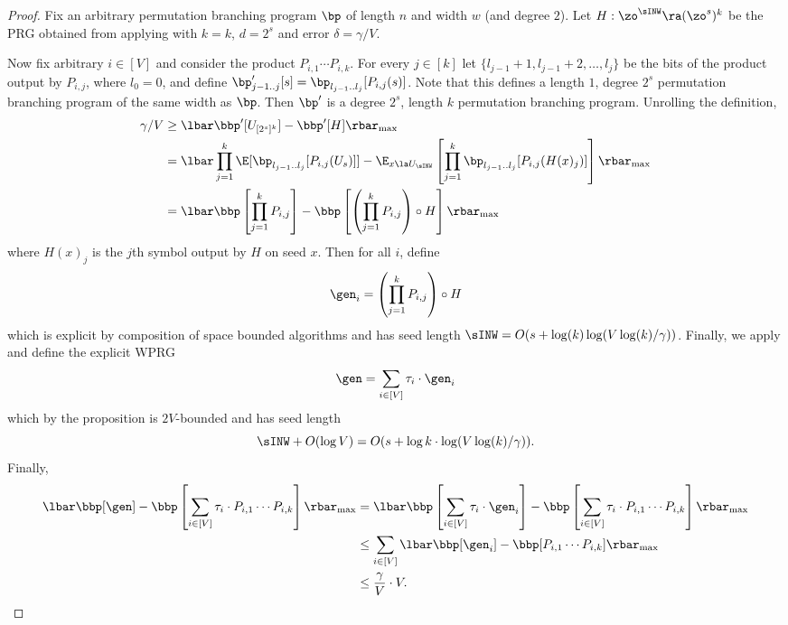 \begin{proof}
Fix an arbitrary permutation branching program $\bp$ of length $n$ and width $w$ (and degree $2$). Let $H:\zo^{\sINW}\ra (\zo^s)^k$ be the PRG obtained from applying  with $k=k$, $d=2^s$ and error $\delta=\gamma/V$.

Now fix arbitrary $i \in [V]$ and consider the product $P_{i,1}\cdots P_{i,k}$. For every $j\in[k]$ let $\{l_{j-1}+1,l_{j-1}+2,\ldots,l_j\}$ be the bits of the product output by $P_{i,j}$, where $l_{0}=0$, and define $\bp'_{j-1..j}[s]=\bp_{l_{j-1}..l_j}[P_{i,j}(s)]$. Note that this defines a length $1$, degree $2^s$ permutation branching program of the same width as $\bp$.
Then $\bp'$ is a degree $2^s$, length $k$ permutation branching program. Unrolling the definition,
\begin{align*}
    \gamma/V &\geq \lbar\bbp'[U_{[2^s]^k}]-\bbp'[H]\rbar_{\max}\\
    &= \lbar \prod_{j=1}^k\E[\bp_{l_{j-1}..l_j}[P_{i,j}(U_s)]] - \E_{x\la U_{\sINW}}\left[ \prod_{j=1}^k\bp_{l_{j-1}..l_j}[P_{i,j}(H(x)_j)]\right]\rbar_{\max}\\
    &= \lbar\bbp\left[\prod_{j=1}^k P_{i,j}\right] - \bbp\left[\left(\prod_{j=1}^k P_{i,j}\right)\circ H\right]\rbar_{\max}
\end{align*}
where $H(x)_j$ is the $j$th symbol output by $H$ on seed $x$. Then for all $i$, define 
\[\gen_i=\left(\prod_{j=1}^k P_{i,j}\right)\circ H\]
which is explicit by composition of space bounded algorithms and has seed length $\sINW=O(s+\log(k)\log(V\log(k)/\gamma))$.
Finally, we apply  and define the explicit WPRG
$$\gen=\sum_{i\in [V]} \tau_i \cdot \gen_i$$
which by the proposition is $2V$-bounded and has seed length \[\sINW+O(\log V)=O(s+\log k\cdot\log(V\log(k)/\gamma)).\]
Finally, 
\begin{align*}
    \lbar \bbp[\gen]-\bbp\left[\sum_{i\in[V]}\tau_i\cdot P_{i,1}\cdots P_{i,k}\right]\rbar_{\max} &=
    \lbar \bbp\left[\sum_{i\in[V]}\tau_i \cdot\gen_i\right]-\bbp\left[\sum_{i\in[V]}\tau_i\cdot P_{i,1}\cdots P_{i,k}\right]\rbar_{\max}\\ 
    &\leq \sum_{i\in [V]}\lbar \bbp[\gen_i] - \bbp[P_{i,1}\cdots P_{i,k}]\rbar_{\max}\\
    &\leq \frac{\gamma}{V}\cdot V. \qedhere 
\end{align*}
\end{proof}

